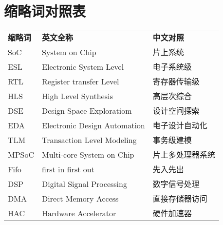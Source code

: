 
\chapter{缩略词对照表}
\begin{table}[]
  \normalsize
  \begin{tabular}{p{3cm}p{6cm}l}
  \textbf{缩略词} & \textbf{英文全称} & \textbf{中文对照}   \\
  SoC & System on Chip & 片上系统 \\
  ESL & Electronic System Level & 电子系统级 \\
  RTL & Register transfer Level & 寄存器传输级 \\
  HLS & High Level Synthesis & 高层次综合 \\
  DSE & Design Space Exploratiom & 设计空间探索 \\
  EDA & Electronic Design Automation & 电子设计自动化 \\
  TLM & Transaction Level Modeling & 事务级建模 \\
  MPSoC & Multi-core System on Chip & 片上多处理器系统 \\
  Fifo & first in first out & 先入先出 \\
  DSP & Digital Signal Processing & 数字信号处理 \\
  DMA & Direct Memory Access & 直接存储器访问 \\
  HAC & Hardware Accelerator & 硬件加速器 
  \end{tabular}
  \end{table}